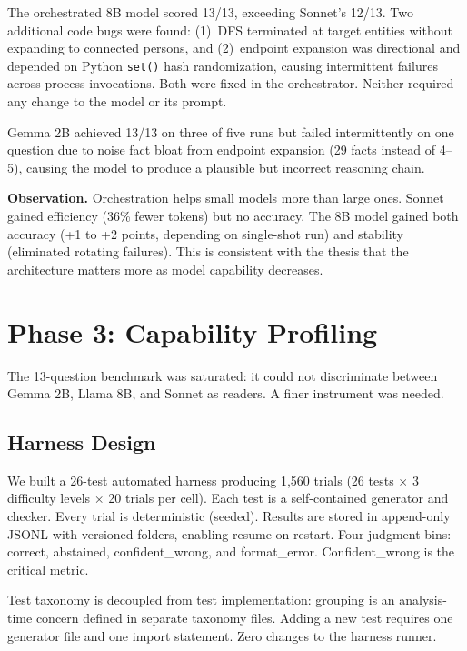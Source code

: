 \documentclass[11pt,a4paper]{article}
\begin{document}
The orchestrated 8B model scored 13/13, exceeding Sonnet's 12/13. Two additional code bugs were found: (1)~DFS terminated at target entities without expanding to connected persons, and (2)~endpoint expansion was directional and depended on Python \texttt{set()} hash randomization, causing intermittent failures across process invocations. Both were fixed in the orchestrator. Neither required any change to the model or its prompt.

Gemma 2B achieved 13/13 on three of five runs but failed intermittently on one question due to noise fact bloat from endpoint expansion (29 facts instead of 4--5), causing the model to produce a plausible but incorrect reasoning chain.

\textbf{Observation.} Orchestration helps small models more than large ones. Sonnet gained efficiency (36\% fewer tokens) but no accuracy. The 8B model gained both accuracy (+1 to +2 points, depending on single-shot run) and stability (eliminated rotating failures). This is consistent with the thesis that the architecture matters more as model capability decreases.

\section{Phase 3: Capability Profiling}
\label{sec:phase3}

The 13-question benchmark was saturated: it could not discriminate between Gemma 2B, Llama 8B, and Sonnet as readers. A finer instrument was needed.

\subsection{Harness Design}

We built a 26-test automated harness producing 1{,}560 trials (26 tests $\times$ 3 difficulty levels $\times$ 20 trials per cell). Each test is a self-contained generator and checker. Every trial is deterministic (seeded). Results are stored in append-only JSONL with versioned folders, enabling resume on restart. Four judgment bins: correct, abstained, confident\_wrong, and format\_error. Confident\_wrong is the critical metric.

Test taxonomy is decoupled from test implementation: grouping is an analysis-time concern defined in separate taxonomy files. Adding a new test requires one generator file and one import statement. Zero changes to the harness runner.
\end{document}
